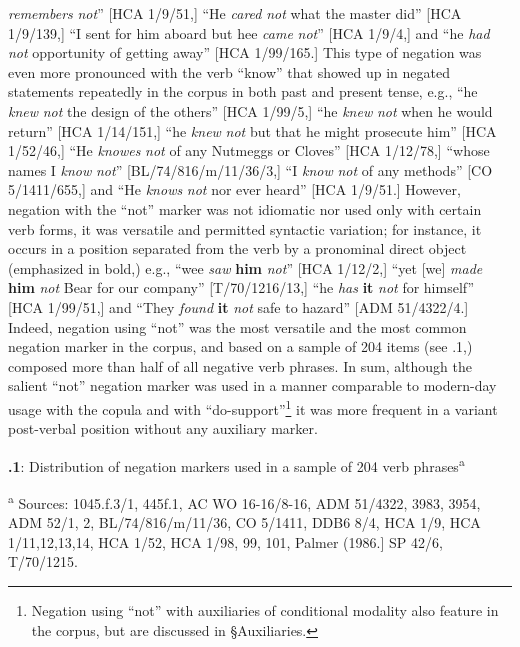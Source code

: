\textit{remembers} \textit{not}” [HCA 1/9/51,] “He \textit{cared} \textit{not} what the master did” [HCA 1/9/139,] “I sent for him aboard but hee \textit{came} \textit{not}” [HCA 1/9/4,] and “he \textit{had} \textit{not} opportunity of getting away” [HCA 1/99/165.] This type of negation was even more pronounced with the verb “know” that showed up in negated statements repeatedly in the corpus in both past and present tense, e.g., “he \textit{knew} \textit{not} the design of the others” [HCA 1/99/5,] “he \textit{knew} \textit{not} when he would return” [HCA 1/14/151,] “he \textit{knew} \textit{not} but that he might prosecute him” [HCA 1/52/46,] “He \textit{knowes} \textit{not} of any Nutmeggs or Cloves” [HCA 1/12/78,] “whose names I \textit{know} \textit{not}” [BL/74/816/m/11/36/3,] “I \textit{know} \textit{not} of any methods” [CO 5/1411/655,] and “He \textit{knows} \textit{not} nor ever heard” [HCA 1/9/51.] However, negation with the “not” marker was not idiomatic nor used only with certain verb forms, it was versatile and permitted syntactic variation; for instance, it occurs in a position separated from the verb by a pronominal direct object (emphasized in bold,) e.g., “wee \textit{saw}\textbf{ }\textbf{him} \textit{not}” [HCA 1/12/2,] “yet [we] \textit{made} \textbf{him} \textit{not} Bear for our company” [T/70/1216/13,] “he \textit{has} \textbf{it} \textit{not} for himself” [HCA 1/99/51,] and “They \textit{found} \textbf{it} \textit{not} safe to hazard” [ADM 51/4322/4.] Indeed, negation using “not” was the most versatile and the most common negation marker in the corpus, and based on a sample of 204 items (see .1,) composed more than half of all negative verb phrases. In sum, although the salient “not” negation marker was used in a manner comparable to modern-day usage with the copula and with “do-support”\footnote{Negation using “not” with auxiliaries of conditional modality also feature in the corpus, but are discussed in §Auxiliaries.} it was more frequent in a variant post-verbal position without any auxiliary marker.


\textbf{.1}: Distribution of negation markers used in a sample of 204 verb phrases\textsuperscript{a} 

\textsuperscript{a} Sources: 1045.f.3/1, 445f.1, AC WO 16-16/8-16, ADM 51/4322, 3983, 3954, ADM 52/1, 2, BL/74/816/m/11/36, CO 5/1411, DDB6 8/4, HCA 1/9, HCA 1/11,12,13,14, HCA 1/52, HCA 1/98, 99, 101, Palmer (1986.] SP 42/6, T/70/1215.


